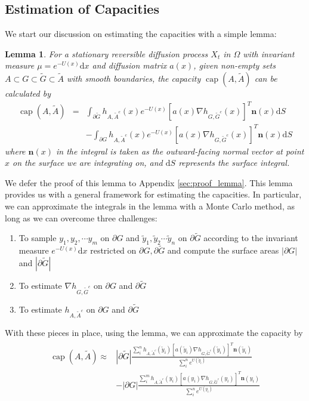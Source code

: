 \documentclass[english, aip, jcp, priprint, graphicx,floatfix]{revtex4-1}
\newcommand{\mathd}{\mathrm{d}}
\newtheorem{lemma}{Lemma}
\theoremstyle{plain}
\theoremstyle{definition}
\theoremstyle{plain}
\begin{document}
\subsection{Estimation of Capacities}

We start our discussion on estimating the capacities with a simple lemma:
\begin{lemma}\label{thm:capacity_lemma}
For a stationary reversible  diffusion process $X_t$ in $\Omega$ with
invariant measure ${\mu}= e^{- U (x)} \mathrm{d} x$ and diffusion matrix
$a (x)$, given non-empty sets $A \subset G \subset \tilde{G} \subset
\tilde{A}$ with smooth boundaries, the capacity
$\ensuremath{\operatorname{cap}} (A, \tilde{A})$ can be calculated by
\begin{eqnarray*}
\ensuremath{\operatorname{cap}} (A, \tilde{A}) & = & \int_{\partial
\tilde{G}}  h_{A,
\tilde{A}^c} (x) e^{- U (x)} [a (x) \nabla h_{G, \tilde{G}^c} (x)]^T \textbf{n} (x)\mathd S\\
&   & - \int_{\partial G}  h_{A, \tilde{A}^c} (x) e^{- U (x)} [a (x) \nabla h_{G, \tilde{G}^c} (x)]^T \textbf{n} (x)\mathd S
\end{eqnarray*}
where ${\textbf{n}} (x)$ in the integral is taken as the outward-facing normal vector at point $x$ on the surface we are integrating on, and $\mathd S$ represents the surface integral.
\end{lemma}

We defer the proof of this lemma to Appendix \ref{sec:proof_lemma}. This lemma provides us with a general framework for estimating the capacities.   In particular, we can approximate the integrals in the lemma with a Monte Carlo method, as long as we can overcome three challenges:
\begin{enumerate}
	\item To sample $y_1,y_2,\cdots y_m$ on $\partial G$ and $\tilde y_1,\tilde y_2 \cdots \tilde y_n$ on $\partial \tilde{G}$ according to the invariant measure $e^{- U(x)}\mathrm{d}x$ restricted on $\partial G, \partial \tilde{G}$ and compute the surface areas $|\partial G|$ and $|\partial \tilde G|$

\item To estimate $\nabla h_{G, \tilde{G}^c}$ on $\partial G$ and
$\partial \tilde{G}$

\item To estimate $h_{A, \tilde{A}^c}$ on $\partial G$ and $\partial
\tilde{G}$
\end{enumerate}
With these pieces in place, using the lemma, we can approximate the capacity by
\begin{gather}\label{eq:capesteq}
\begin{array}{cc}
\ensuremath{\operatorname{cap}} (A, \tilde{A}) \approx & 
|\partial \tilde G|\frac{\sum_i^n h_{A,\tilde A^c}(\tilde y_i)[a(\tilde y_i)\nabla h_{G,\tilde G^c}(\tilde y_i)]^T \textbf{n}(\tilde y_i)}{\sum_i^n e^{U(\tilde y_i)}} \\
& - |\partial G|\frac{\sum_i^m h_{A,\tilde A^c}(y_i)[a(y_i)\nabla h_{G,\tilde G^c}(y_i)]^T \textbf{n}(y_i)}{\sum_i^n e^{U(y_i)}} 
\end{array}
\end{gather}
\end{document}
